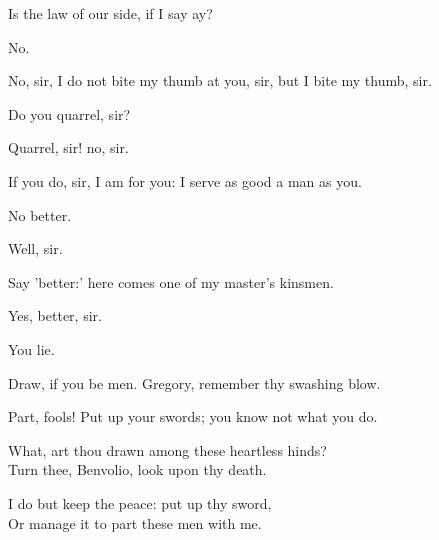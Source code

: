 \begin{speech}
 Is the law of our
side, if I say ay?
\end{speech}
\begin{speech}
No.
\end{speech}
\begin{speech}
No, sir, I do not bite my thumb at
you, sir, but I bite my thumb, sir.
\end{speech}
\begin{speech}
Do you quarrel, sir?
\end{speech}
\begin{speech}
Quarrel, sir! no, sir.
\end{speech}
\begin{speech}
If you do, sir, I am for you: I
serve as good a man as you.
\end{speech}
\begin{speech}
No better.
\end{speech}
\begin{speech}
Well, sir.
\end{speech}
\begin{speech}
Say 'better:' here comes one of my
master's kinsmen.
\end{speech}
\begin{speech}
Yes, better, sir.
\end{speech}
\begin{speech}
You lie.
\end{speech}
\begin{speech}
Draw, if you be men. Gregory, remember
thy swashing blow.  
\end{speech}
\begin{speech}
Part, fools!
Put up your swords; you know not what you do.  
\end{speech}
\begin{speech}
What, art thou drawn among these heartless hinds?
\\
Turn thee, Benvolio, look upon thy death. \\
\end{speech}
\begin{speech}
I do but keep the peace: put up thy sword, \\
Or manage it to part these men with me. \\
\end{speech}
